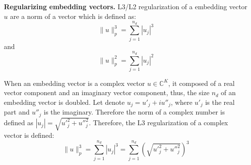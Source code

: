 \begin{table}[!htbp]
\centering
{}
\caption{Equivalence of regularization weights between two codebases.}
\label{tab:Reg for emb}
\end{table}


\noindent\textbf{Regularizing embedding vectors.} L3/L2 regularization of a embedding vector $u$ are a norm of a vector which is defined as:
\begin{equation}
    \label{eq:N3}
    \|u \|^3_p = \sum_{j=1}^{n_d}|u_j|^3
\end{equation} and \begin{equation}
    \label{eq:L2}
    \|u \|^2_p = \sum_{j=1}^{n_d}|u_j|^2
\end{equation}

When an embedding vector is a complex vector $u \in \mathbb{C}^K$, it composed of a real vector component and an imaginary vector component, thus, the size $n_d$ of an embedding vector is doubled. Let denote $u_j = u'_j + iu''_j$, where $u'_j$ is the real part and $u''_j$ is the imaginary. Therefore the norm of a complex number is defined as $|u_j| = \sqrt{{u'}_j^2 + {u''}_j^2}$. Therefore, the L3 regularization of a complex vector is defined:
\begin{equation}
    \label{eq:final N3}
    \|u \|^3_p = \sum_{j=1}^{n_d}|u_j|^3 = \sum_{j=1}^{n_d}\left(\sqrt{{u'}_j^2 + {u''}_j^2}\right)^3
\end{equation} 

